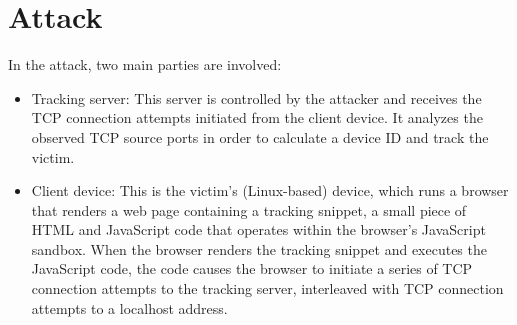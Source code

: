 \documentclass{report}
\begin{document}
\begin{center}
	\begin{minipage}[t]{0.5\textwidth}
		\vspace{0cm}

		
	\end{minipage}
\end{center}


\vspace{0.5cm}
\chapter{Attack}
\label{sec:attack}

%
%
%
In the attack, two main parties are involved:

\begin{itemize}
    \item \alert{Tracking server}: This server is controlled by the \alert{attacker} and receives the TCP connection attempts initiated from the client device. It analyzes the observed TCP source ports in order to calculate a device ID and track the victim.%
    
    \item \alert{Client device}: This is the \alert{victim’s} (Linux-based) device, which runs a browser that renders a web page containing a \alert{tracking snippet}, a small piece of HTML and JavaScript code that operates within the browser’s JavaScript sandbox. When the browser renders the tracking snippet and executes the JavaScript code, the code causes the browser to initiate a series of TCP connection attempts to the \alert{tracking server}, interleaved with TCP connection attempts to a \alert{localhost address}. %
\end{itemize}
\end{document}
